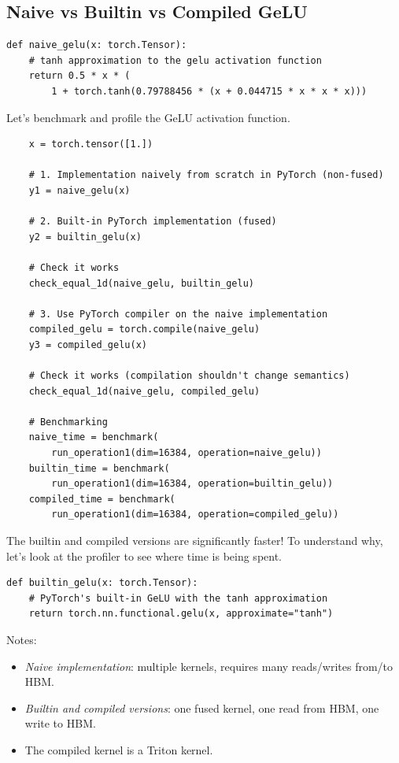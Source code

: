 \documentclass[12pt,twoside]{article}
\begin{document}
\subsection*{Naive vs Builtin vs Compiled GeLU}

\begin{verbatim}
def naive_gelu(x: torch.Tensor):
    # tanh approximation to the gelu activation function
    return 0.5 * x * (
        1 + torch.tanh(0.79788456 * (x + 0.044715 * x * x * x)))
\end{verbatim}

Let's benchmark and profile the GeLU activation function.

\begin{verbatim}
    x = torch.tensor([1.])  
    
    # 1. Implementation naively from scratch in PyTorch (non-fused)
    y1 = naive_gelu(x)  
    
    # 2. Built-in PyTorch implementation (fused)
    y2 = builtin_gelu(x)  
    
    # Check it works
    check_equal_1d(naive_gelu, builtin_gelu)
    
    # 3. Use PyTorch compiler on the naive implementation
    compiled_gelu = torch.compile(naive_gelu)  
    y3 = compiled_gelu(x)  
    
    # Check it works (compilation shouldn't change semantics) 
    check_equal_1d(naive_gelu, compiled_gelu)  
    
    # Benchmarking
    naive_time = benchmark(
        run_operation1(dim=16384, operation=naive_gelu)) 
    builtin_time = benchmark(
        run_operation1(dim=16384, operation=builtin_gelu)) 
    compiled_time = benchmark(
        run_operation1(dim=16384, operation=compiled_gelu)) 
\end{verbatim}

The builtin and compiled versions are significantly faster! To understand why, let's look at the profiler to see where time is being spent. 

\begin{verbatim}
def builtin_gelu(x: torch.Tensor):
    # PyTorch's built-in GeLU with the tanh approximation
    return torch.nn.functional.gelu(x, approximate="tanh")    
\end{verbatim}

Notes:

\begin{itemize}
    \item \textit{Naive implementation}: multiple kernels, requires many reads/writes from/to HBM.
    \item \textit{Builtin and compiled versions}: one fused kernel, one read from HBM, one write to HBM.
    \item The compiled kernel is a Triton kernel.
\end{itemize}
\end{document}
